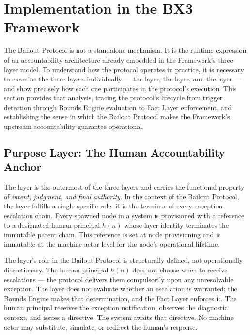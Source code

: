 \section{Implementation in the BX3 Framework}
\label{sec:implementation}

The Bailout Protocol is not a standalone mechanism. It is the runtime expression of an accountability architecture already embedded in the \bxthree{} Framework's three-layer model. To understand how the protocol operates in practice, it is necessary to examine the three layers individually --- the \purpose{} layer, the \bounds{} layer, and the \fact{} layer --- and show precisely how each one participates in the protocol's execution. This section provides that analysis, tracing the protocol's lifecycle from trigger detection through Bounds Engine evaluation to Fact Layer enforcement, and establishing the sense in which the Bailout Protocol makes the \bxthree{} Framework's upstream accountability guarantee operational.

\subsection{Purpose Layer: The Human Accountability Anchor}
\label{sec:purpose-layer}

The \purpose{} layer is the outermost of the three \bxthree{} layers and carries the functional property of \emph{intent, judgment, and final authority}. In the context of the Bailout Protocol, the \purpose{} layer fulfills a single specific role: it is the terminus of every exception-escalation chain. Every spawned node in a \bxthree{} system is provisioned with a reference to a designated human principal $h(n)$ whose \purpose{} layer identity terminates the immutable parent chain. This reference is set at node provisioning and is immutable at the machine-actor level for the node's operational lifetime.

The \purpose{} layer's role in the Bailout Protocol is structurally defined, not operationally discretionary. The human principal $h(n)$ does not choose when to receive escalations --- the protocol delivers them compulsorily upon any unresolvable exception. The \purpose{} layer does not evaluate whether an escalation is warranted; the Bounds Engine makes that determination, and the Fact Layer enforces it. The human principal receives the exception notification, observes the diagnostic context, and issues a directive. The system awaits that directive. No machine actor may substitute, simulate, or redirect the human's response.

